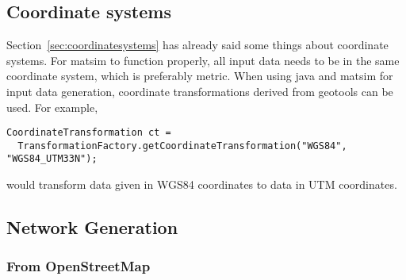 %
%

\subsection{Coordinate systems}

Section~\ref{sec:coordinatesystems} has already said some things about coordinate systems.   For \gls{matsim} to function properly, all input data needs to be in the same coordinate system, which is preferably metric.  When using \gls{java} and \gls{matsim} for input data generation, coordinate transformations derived from geotools \citep{geotools-www-page} can be used.  For example, 
\begin{lstlisting}
CoordinateTransformation ct = 
  TransformationFactory.getCoordinateTransformation("WGS84", "WGS84_UTM33N");
\end{lstlisting}
would transform data given in WGS84 coordinates to data in UTM coordinates.

\subsection{Network Generation}

\subsubsection{From OpenStreetMap}
\label{sec:network-from-osm}

